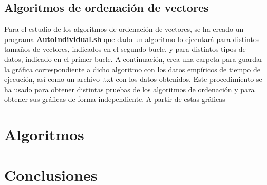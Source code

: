 \documentclass[11pt]{article}
\newcommand{\negrita}[1]{\textbf{#1}}
\begin{document}
    \subsection*{Algoritmos de ordenación de vectores}
    Para el estudio de los algoritmos de ordenación de vectores, se ha creado un programa \negrita{AutoIndividual.sh} que dado un
    algoritmo lo ejecutará para distintos tamaños de vectores, indicados en el segundo bucle, y para
    distintos tipos de datos, indicado en el primer bucle. A continuación, crea una carpeta para guardar la gráfica
    correspondiente a dicho algoritmo con los datos empíricos de tiempo de ejecución, así como un archivo .txt
    con los datos obtenidos. Este procedimiento se ha usado para obtener distintas pruebas de los algoritmos de
    ordenación y para obtener sus gráficas de forma independiente.
    A partir de estas gráficas 
    
\section{Algoritmos}
\section{Conclusiones}
\end{document}
